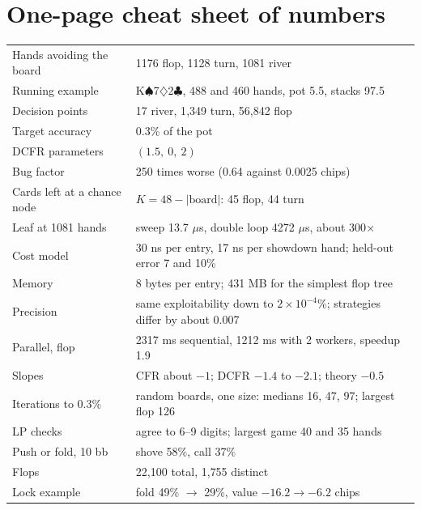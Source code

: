 \documentclass[11pt]{article}
\newcommand{\SP}{\ensuremath{\spadesuit}}\newcommand{\DI}{\ensuremath{\diamondsuit}}\newcommand{\CL}{\ensuremath{\clubsuit}}
\begin{document}
\section{One-page cheat sheet of numbers}
\begin{center}\small
\begin{tabular}{ll}
\toprule
Hands avoiding the board & 1176 flop, 1128 turn, 1081 river\\
Running example & K\SP 7\DI 2\CL, 488 and 460 hands, pot 5.5, stacks 97.5\\
Decision points & 17 river, 1{,}349 turn, 56{,}842 flop\\
Target accuracy & 0.3\% of the pot\\
DCFR parameters & $(1.5,\ 0,\ 2)$\\
Bug factor & 250 times worse (0.64 against 0.0025 chips)\\
Cards left at a chance node & $K=48-|\text{board}|$: 45 flop, 44 turn\\
Leaf at 1081 hands & sweep 13.7 $\mu$s, double loop 4272 $\mu$s, about 300$\times$\\
Cost model & 30 ns per entry, 17 ns per showdown hand; held-out error 7 and 10\%\\
Memory & 8 bytes per entry; 431 MB for the simplest flop tree\\
Precision & same exploitability down to $2\times10^{-4}$\%; strategies differ by about 0.007\\
Parallel, flop & 2317 ms sequential, 1212 ms with 2 workers, speedup 1.9\\
Slopes & CFR about $-1$; DCFR $-1.4$ to $-2.1$; theory $-0.5$\\
Iterations to 0.3\% & random boards, one size: medians 16, 47, 97; largest flop 126\\
LP checks & agree to 6--9 digits; largest game 40 and 35 hands\\
Push or fold, 10 bb & shove 58\%, call 37\%\\
Flops & 22{,}100 total, 1{,}755 distinct\\
Lock example & fold 49\% $\to$ 29\%, value $-16.2\to-6.2$ chips\\ \bottomrule
\end{tabular}
\end{center}
\end{document}
